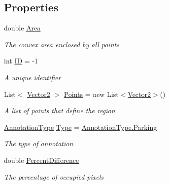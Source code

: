 \subsection*{Properties}
\begin{DoxyCompactItemize}
\item 
double \mbox{\hyperlink{class_eagle_eye_1_1_models_1_1_annotation_a7aa19d95b7a54855720530c69e9b2500}{Area}}
\begin{DoxyCompactList}\small\item\em The convex area enclosed by all points \end{DoxyCompactList}\item 
int \mbox{\hyperlink{class_eagle_eye_1_1_models_1_1_annotation_aeebf4ecafcfcdf37537dcd03d0cc150e}{ID}} = -\/1
\begin{DoxyCompactList}\small\item\em A unique identifier \end{DoxyCompactList}\item 
List$<$ \mbox{\hyperlink{struct_eagle_eye_1_1_models_1_1_geometry_1_1_vector2}{Vector2}} $>$ \mbox{\hyperlink{class_eagle_eye_1_1_models_1_1_annotation_a6a74da70cd09dda23b55cc889e5c84bb}{Points}} = new List$<$\mbox{\hyperlink{struct_eagle_eye_1_1_models_1_1_geometry_1_1_vector2}{Vector2}}$>$()
\begin{DoxyCompactList}\small\item\em A list of points that define the region \end{DoxyCompactList}\item 
\mbox{\hyperlink{class_eagle_eye_1_1_models_1_1_annotation_a38b72003ea887909fe12d6382092f7d9}{Annotation\+Type}} \mbox{\hyperlink{class_eagle_eye_1_1_models_1_1_annotation_a06bc959cdecde76cfbea151576ab8ef5}{Type}} = \mbox{\hyperlink{class_eagle_eye_1_1_models_1_1_annotation_a38b72003ea887909fe12d6382092f7d9abaaacd7280e91aface947a1cc19d0f79}{Annotation\+Type.\+Parking}}
\begin{DoxyCompactList}\small\item\em The type of annotation \end{DoxyCompactList}\item 
double \mbox{\hyperlink{class_eagle_eye_1_1_models_1_1_annotation_a47f59fa94ef8e7709e677aae1397ee00}{Percent\+Difference}}
\begin{DoxyCompactList}\small\item\em The percentage of occupied pixels \end{DoxyCompactList}\end{DoxyCompactItemize}


